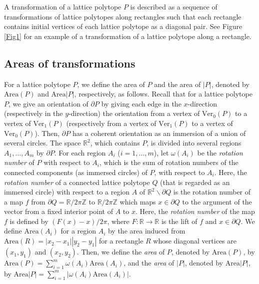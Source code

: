 \documentclass[a4paper,11pt]{amsart}
\numberwithin{equation}{section}
\begin{document}
A transformation of a lattice polytope $P$ is described as a sequence of transformations of lattice polytopes along rectangles such that each rectangle contains initial vertices of each lattice polytope as a diagonal pair. See Figure \ref{Fig1} for an example of a transformation of a lattice polytope along a rectangle. 




\subsection{Areas of transformations}\label{sec4-2}

For a lattice polytope $P$, we define the area of $P$ and the area of $|P|$, denoted by $\mathrm{Area}(P)$ and $\mathrm{Area}|P|$, respectively, as follows. 
Recall that for a lattice polytope $P$, 
we give an orientation of $\partial P$ by giving each edge in the $x$-direction (respectively in the $y$-direction) the orientation from a vertex of $\mathrm{Ver}_0(P)$ to a vertex of $\mathrm{Ver}_1(P)$ (respectively from a vertex of $\mathrm{Ver}_1(P)$ to a vertex of $\mathrm{Ver}_0(P)$). Then, $\partial P$ has a coherent orientation as an immersion of a union of several circles. 
The space $\mathbb{R}^2$, which contains $P$, is divided into several regions $A_1,\ldots, A_m$ by $\partial P$. For each region $A_i$ ($i=1,\dots,m$), let $\omega(A_i)$ be the {\it rotation number} of $P$ with respect to $A_i$, which is the sum of rotation numbers of the connected components (as immersed circles) 
of $P$, with respect to $A_i$. Here, the {\it rotation number} of a connected lattice polytope $Q$ (that is regarded as an immersed circle) with respect to a region $A$ of $\mathbb{R}^2 \backslash\partial Q$ is the rotation number of a map $f$ from $\partial Q=\mathbb{R}/2\pi \mathbb{Z}$ to $\mathbb{R}/2\pi\mathbb{Z}$ which maps $x \in \partial Q$ to the argument of the vector from a fixed interior point of $A$ to $x$. Here, the {\it rotation number} of the map $f$ is defined by 
$(F(x)-x)/2\pi$, where $F: \mathbb{R} \to \mathbb{R}$ is the lift of $f$ and $x \in \partial Q$.
We define $\mathrm{Area}(A_i)$ for a region $A_i$ by the area induced from $\mathrm{Area}(R)=|x_2-x_1||y_2-y_1|$ for a rectangle $R$ whose diagonal vertices are $(x_1, y_1)$ and  $(x_2, y_2)$. 
Then, we define the {\it area} of $P$, denoted by $\mathrm{Area}(P)$, by $\mathrm{Area}(P)=\sum_{i=1}^m \omega(A_i)\mathrm{Area}(A_i)$, and the {\it area} of $|P|$, denoted by $\mathrm{Area}|P|$, by $\mathrm{Area}|P|=\sum_{i=1}^m |\omega(A_i)\mathrm{Area}(A_i)|$. 
 
\end{document}
